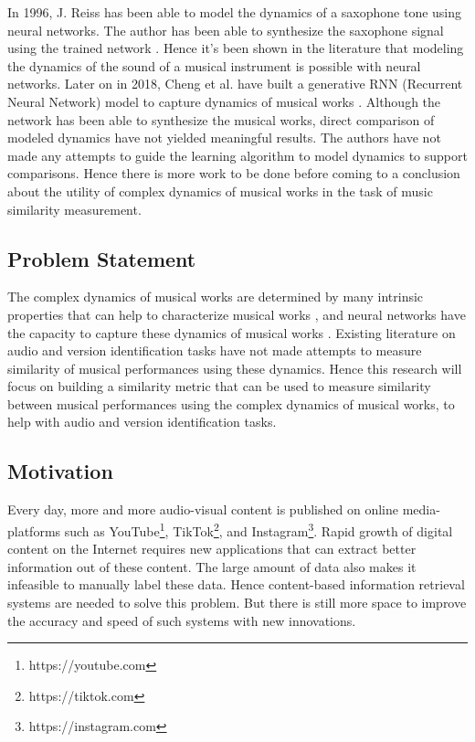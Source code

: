 \documentclass[../main.tex]{subfiles}
\begin{document}
\par
In 1996, J. Reiss has been able to model the dynamics of a saxophone tone using neural networks. The author has been able to synthesize the saxophone signal using the trained network \cite{robelNeuralNetworkModeling1996}. Hence it's been shown in the literature that modeling the dynamics of the sound of a musical instrument is possible with neural networks. Later on in 2018, Cheng et al. have built a generative \gls{RNN} (Recurrent Neural Network) model to capture dynamics of musical works  \cite{tian_cheng_comparing_2018}. Although the network has been able to synthesize the musical works, direct comparison of modeled dynamics have not yielded meaningful results. The authors have not made any attempts to guide the learning algorithm to model dynamics to support comparisons. Hence there is more work to be done before coming to a conclusion about the utility of complex dynamics of musical works in the task of music similarity measurement.


\subsection{Problem Statement}

\par
The complex dynamics of musical works are determined by many intrinsic properties that can help to characterize musical works \cite{complex_dynamics}, and neural networks have the capacity to capture these dynamics of musical works \cite{robelNeuralNetworkModeling1996}\cite{dynamic_process_modeling_with_rnn}. Existing literature on audio and version identification tasks have not made attempts to measure similarity of musical performances using these dynamics. Hence this research will focus on building a similarity metric that can be used to measure similarity between musical performances using the complex dynamics of musical works, to help with audio and version identification tasks.



\subsection{Motivation}

\par
Every day, more and more audio-visual content is published on online media-platforms such as YouTube\footnote{https://youtube.com}, TikTok\footnote{https://tiktok.com}, and Instagram\footnote{https://instagram.com}. Rapid growth of digital content on the Internet requires new applications that can extract better information out of these content. The large amount of data also makes it infeasible to manually label these data. Hence content-based information retrieval systems are needed to solve this problem. But there is still more space to improve the accuracy and speed of such systems with new innovations.
\end{document}
